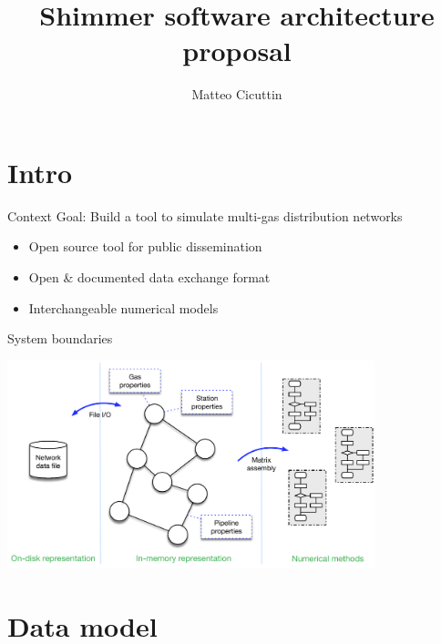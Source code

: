 \documentclass[10pt,aspectratio=169]{beamer}
\title{Shimmer software architecture proposal}
\author{Matteo Cicuttin}
\institute{DISMA - PoliTO}
\begin{document}
\maketitle

\section{Intro}
\begin{frame}{Context}
    Goal: Build a tool to simulate multi-gas distribution networks

    \vspace{3mm}

    \begin{itemize}
        \item Open source tool for public dissemination
        \item Open \& documented data exchange format
        \item Interchangeable numerical models
    \end{itemize}

\end{frame}

\begin{frame}{System boundaries}

\begin{center}
    \includegraphics[width=0.8\textwidth]{img/system_arch}
\end{center}

\end{frame}

\section{Data model}
\end{document}
